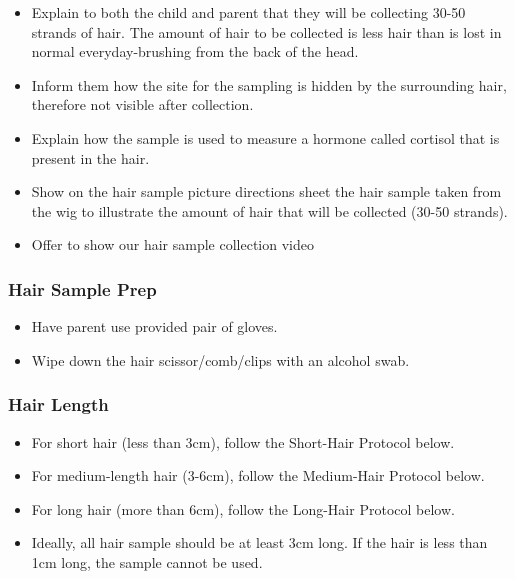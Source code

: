 \documentclass[]{book}
\providecommand{\tightlist}{%
  \setlength{\itemsep}{0pt}\setlength{\parskip}{0pt}}
\begin{document}
\begin{itemize}
\tightlist
\item
  Explain to both the child and parent that they will be collecting 30-50 strands of hair. The amount of hair to be collected is less hair than is lost in normal everyday-brushing from the back of the head.
\item
  Inform them how the site for the sampling is hidden by the surrounding hair, therefore not visible after collection.
\item
  Explain how the sample is used to measure a hormone called cortisol that is present in the hair.
\item
  Show on the hair sample picture directions sheet the hair sample taken from the wig to illustrate the amount of hair that will be collected (30-50 strands).
\item
  Offer to show our hair sample collection video
\end{itemize}

\hypertarget{hair-sample-prep}{%
\subsubsection{Hair Sample Prep}\label{hair-sample-prep}}

\begin{itemize}
\tightlist
\item
  Have parent use provided pair of gloves.
\item
  Wipe down the hair scissor/comb/clips with an alcohol swab.
\end{itemize}

\hypertarget{hair-length}{%
\subsubsection{Hair Length}\label{hair-length}}

\begin{itemize}
\tightlist
\item
  For short hair (less than 3cm), follow the Short-Hair Protocol below.
\item
  For medium-length hair (3-6cm), follow the Medium-Hair Protocol below.
\item
  For long hair (more than 6cm), follow the Long-Hair Protocol below.
\item
  Ideally, all hair sample should be at least 3cm long. If the hair is less than 1cm long, the sample cannot be used.
\end{itemize}
\end{document}
